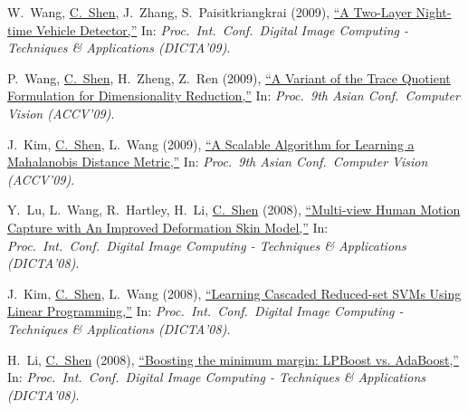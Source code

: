 \documentclass[9pt, a4paper]{article}
\newcommand{\years}[1]{\marginnote{\scriptsize #1}}
\def\highlight{\uline}
\begin{document}
\medskip

\years{2009} W.~Wang, \highlight{C.~Shen}, J.~Zhang, S.~Paisitkriangkrai (2009),
\href{http://www.google.com/search?lr=&ie=UTF-8&oe=UTF-8&q=A+Two-Layer+Night-time+Vehicle+Detector+Weihong+Wang%2C+Chunhua+Shen%2C+Jian+Zhang%2C+Sakrapee+Paisitkriangkrai}{``A Two-Layer Night-time Vehicle Detector,{}''}
In: \emph{Proc.\ Int.\ Conf.\  Digital Image Computing - Techniques \& Applications (DICTA'09)}.

\medskip

\years{2009} P.~Wang, \highlight{C.~Shen}, H.~Zheng, Z.~Ren (2009),
\href{http://www.google.com/search?lr=&ie=UTF-8&oe=UTF-8&q=A+Variant+of+the+Trace+Quotient+Formulation+for+Dimensionality+Reduction+Peng+Wang%2C+Chunhua+Shen%2C+Hong+Zheng%2C+Zhang+Ren}{``A Variant of the Trace Quotient Formulation for Dimensionality Reduction,{}''}
In: \emph{Proc.\ 9th Asian Conf.\  Computer Vision (ACCV'09)}.

\medskip

\years{2009} J.~Kim, \highlight{C.~Shen}, L.~Wang (2009),
\href{http://www.google.com/search?lr=&ie=UTF-8&oe=UTF-8&q=A+Scalable+Algorithm+for+Learning+a+Mahalanobis+Distance+Metric+Junae+Kim%2C+Chunhua+Shen%2C+Lei+Wang}{``A Scalable Algorithm for Learning a {M}ahalanobis Distance Metric,{}''}
In: \emph{Proc.\ 9th Asian Conf.\  Computer Vision (ACCV'09)}.

\medskip

\years{2008} Y.~Lu, L.~Wang, R.~Hartley, H.~Li, \highlight{C.~Shen} (2008),
\href{http://www.google.com/search?lr=&ie=UTF-8&oe=UTF-8&q=Multi-view+Human+Motion+Capture+with+An+Improved+Deformation+Skin+Model+Yifan+Lu%2C+Lei+Wang%2C+Richard+Hartley%2C+Hongdong+Li%2C+Chunhua+Shen}{``Multi-view Human Motion Capture with An Improved Deformation Skin Model,{}''}
In: \emph{Proc.\ Int.\ Conf.\  Digital Image Computing - Techniques \& Applications (DICTA'08)}.

\medskip

\years{2008} J.~Kim, \highlight{C.~Shen}, L.~Wang (2008),
\href{http://www.google.com/search?lr=&ie=UTF-8&oe=UTF-8&q=Learning+Cascaded+Reduced-set+SVMs+Using+Linear+Programming+Junae+Kim%2C+Chunhua+Shen%2C+Lei+Wang}{``Learning Cascaded Reduced-set {SVM}s Using Linear Programming,{}''}
In: \emph{Proc.\ Int.\ Conf.\  Digital Image Computing - Techniques \& Applications (DICTA'08)}.

\medskip

\years{2008} H.~Li, \highlight{C.~Shen} (2008),
\href{http://www.google.com/search?lr=&ie=UTF-8&oe=UTF-8&q=Boosting+the+minimum+margin%3A+LPBoost+vs.+AdaBoost+Hanxi+Li%2C+Chunhua+Shen}{``Boosting the minimum margin: {LPBoost} vs. {AdaBoost},{}''}
In: \emph{Proc.\ Int.\ Conf.\  Digital Image Computing - Techniques \& Applications (DICTA'08)}.
\end{document}
